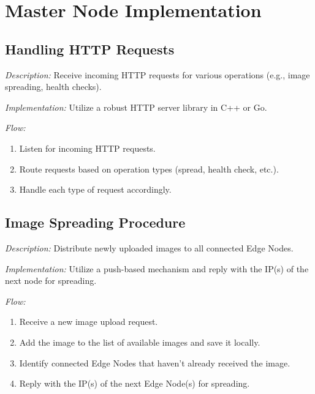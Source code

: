 \documentclass{article}
\begin{document}
  \newpage









  \section{Master Node Implementation}

  \subsection{Handling HTTP Requests}

  \textit{Description:} Receive incoming HTTP requests for various operations (e.g., image spreading, health checks).

  \textit{Implementation:} Utilize a robust HTTP server library in C++ or Go.

  \textit{Flow:}
  \begin{enumerate}[label=\arabic*.]
    \item Listen for incoming HTTP requests.

    \item Route requests based on operation types (spread, health check, etc.).

    \item Handle each type of request accordingly.
  \end{enumerate}



  \subsection{Image Spreading Procedure}

  \textit{Description:} Distribute newly uploaded images to all connected Edge Nodes.

  \textit{Implementation:} Utilize a push-based mechanism and reply with the IP(s) of the next node for spreading.

  \textit{Flow:}
  \begin{enumerate}[label=\arabic*.]
    \item Receive a new image upload request.

    \item Add the image to the list of available images and save it locally.

    \item Identify connected Edge Nodes that haven't already received the image.

    \item Reply with the IP(s) of the next Edge Node(s) for spreading.
  \end{enumerate}
\end{document}
